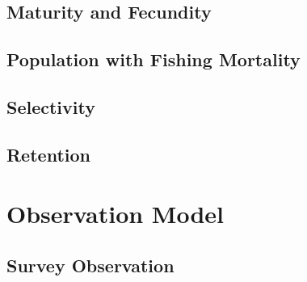 \documentclass[11pt,
  english,
  letterpaper,
]{article}
\begin{document}

\hypertarget{maturity-and-fecundity}{%
\subsection{Maturity and Fecundity}\label{maturity-and-fecundity}}

\leavevmode\tagmcend\tagstructend


\hypertarget{population-with-fishing-mortality}{%
\subsection{Population with Fishing Mortality}\label{population-with-fishing-mortality}}

\leavevmode\tagmcend\tagstructend


\hypertarget{selectivity}{%
\subsection{Selectivity}\label{selectivity}}

\leavevmode\tagmcend\tagstructend


\hypertarget{retention}{%
\subsection{Retention}\label{retention}}

\leavevmode\tagmcend\tagstructend


\hypertarget{observation-model}{%
\section{Observation Model}\label{observation-model}}

\leavevmode\tagmcend\tagstructend


\hypertarget{survey-observation}{%
\subsection{Survey Observation}\label{survey-observation}}
\end{document}
